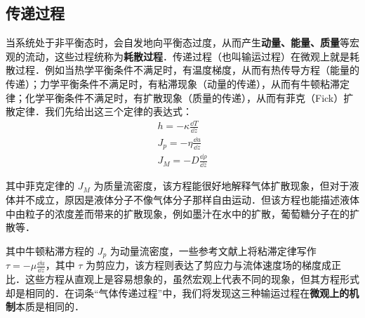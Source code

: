 \subsection{传递过程}
当系统处于非平衡态时，会自发地向平衡态过度，从而产生\textbf{动量、能量、质量}等宏观的流动，这些过程统称为\textbf{耗散过程}．传递过程（也叫输运过程）在微观上就是耗散过程．例如当热学平衡条件不满足时，有温度梯度，从而有热传导方程（能量的传递）；力学平衡条件不满足时，有粘滞现象（动量的传递），从而有牛顿粘滞定律；化学平衡条件不满足时，有扩散现象（质量的传递），从而有菲克（Fick）扩散定律．我们先给出这三个定律的表达式：
\begin{align}
h=-\kappa \frac{\dd T}{\dd z}\\
J_p=-\eta \frac{\dd u}{\dd z}\\
J_M=-D\frac{\dd \rho}{\dd z}
\end{align}

其中菲克定律的 $J_M$ 为质量流密度，该方程能很好地解释气体扩散现象，但对于液体并不成立，原因是液体分子不像气体分子那样自由运动．但该方程也能描述液体中由粒子的浓度差而带来的扩散现象，例如墨汁在水中的扩散，葡萄糖分子在的扩散等．

其中牛顿粘滞方程的 $J_p$ 为动量流密度，一些参考文献上将粘滞定律写作 $\tau = -\mu \frac{\dd u}{\dd z}$，其中 $\tau$ 为剪应力，该方程则表达了剪应力与流体速度场的梯度成正比．这些方程从直观上是容易想象的，虽然宏观上代表不同的现象，但其方程形式却是相同的．在词条“气体传递过程”中，我们将发现这三种输运过程在\textbf{微观上的机制}本质是相同的．
